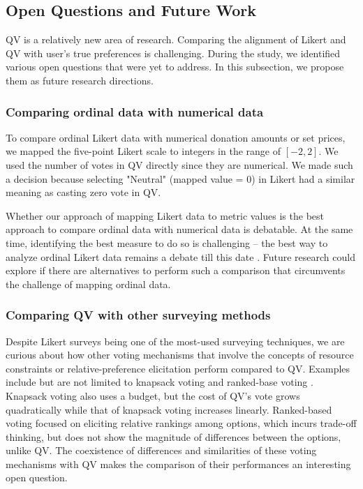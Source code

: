 \subsection{Open Questions and Future Work}
QV is a relatively new area of research. Comparing the alignment of Likert and QV with user's true preferences is challenging. During the study, we identified various open questions that were yet to address. In this subsection, we propose them as future research directions.

\subsubsection{Comparing ordinal data with numerical data}
To compare ordinal Likert data with numerical donation amounts or set prices, we mapped the five-point Likert scale to integers in the range of $[-2, 2]$. We used the number of votes in QV directly since they are numerical. We made such a decision because selecting "Neutral" (mapped value = 0) in Likert had a similar meaning as casting zero vote in QV.

Whether our approach of mapping Likert data to metric values is the best approach to compare ordinal data with numerical data is debatable. At the same time, identifying the best measure to do so is challenging -- the best way to analyze ordinal Likert data remains a debate till this date \cite{gob2007ordinal}. Future research could explore if there are alternatives to perform such a comparison that circumvents the challenge of mapping ordinal data. 

\subsubsection{Comparing QV with other surveying methods}
Despite Likert surveys being one of the most-used surveying techniques, we are curious about how other voting mechanisms that involve the concepts of resource constraints or relative-preference elicitation perform compared to QV. Examples include but are not limited to knapsack voting \cite{goel2015knapsack} and ranked-base voting \cite{ledo2018evaluation}. Knapsack voting also uses a budget, but the cost of QV's vote grows quadratically while that of knapsack voting increases linearly. Ranked-based voting focused on eliciting relative rankings among options, which incurs trade-off thinking, but does not show the magnitude of differences between the options, unlike QV. The coexistence of differences and similarities of these voting mechanisms with QV makes the comparison of their performances an interesting open question.

